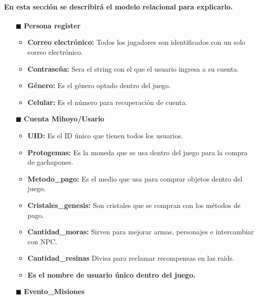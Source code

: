 \documentclass{report}
\begin{document}
\paragraph{En esta sección se describirá el modelo relacional para explicarlo.}
\begin{itemize}
    \item[$\blacksquare$] \textbf{Persona register}
        \begin{itemize}
            \item \textbf{Correo electrónico:} Todos los jugadores son identificados con un solo correo electrónico.
            \item \textbf{Contraseña: }Sera el string con el que el usuario ingresa a su cuenta.
            \item \textbf{Género:} Es el género optado dentro del juego.
            \item \textbf{Celular:} Es el número para recuperación de cuenta.
        \end{itemize}
    \item[$\blacksquare$] \textbf{Cuenta Mihoyo/Usario}
        \begin{itemize}
            \item \textbf{UID:} Es el ID único que tienen todos los usuarios.
            \item \textbf{Protogemas:} Es la moneda que se usa dentro del juego para la compra de gachapones.
            \item \textbf{Metodo\_pago:} Es el medio que usa para comprar objetos dentro del juego.
            \item \textbf{Cristales\_genesis:} Son cristales que se compran con los métodos de pago.
            \item \textbf{Cantidad\_moras:} Sirven para mejorar armas, personajes e intercambiar con NPC.
            \item \textbf{Cantidad\_resinas} Divisa para reclamar recompensas en las raids.
            \item \textbf{Es el nombre de usuario único dentro del juego.}
        \end{itemize}
    \item [$\blacksquare$]\textbf{Evento\_Misiones}

\end{itemize}
\end{document}
